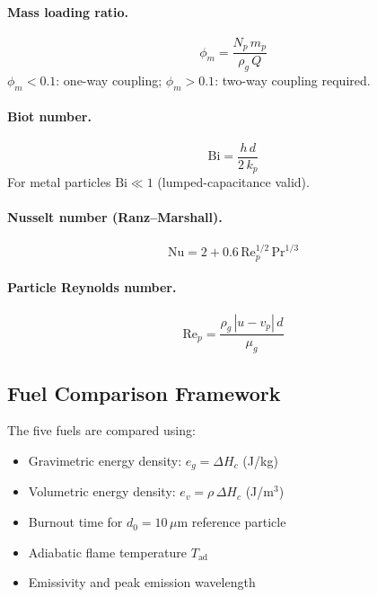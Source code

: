 \documentclass[11pt,a4paper]{article}
\begin{document}
\paragraph{Mass loading ratio.}
\begin{equation}\label{eq:phi_m}
  \phi_m = \frac{N_p\,m_p}{\rho_g\,Q}
\end{equation}
$\phi_m < 0.1$: one-way coupling; $\phi_m > 0.1$: two-way coupling required.

\paragraph{Biot number.}
\begin{equation}\label{eq:Bi}
  \mathrm{Bi} = \frac{h\,d}{2\,k_p}
\end{equation}
For metal particles $\mathrm{Bi} \ll 1$ (lumped-capacitance valid).

\paragraph{Nusselt number (Ranz--Marshall).}
\begin{equation}\label{eq:Nu_RM}
  \mathrm{Nu} = 2 + 0.6\,\mathrm{Re}_p^{1/2}\,\mathrm{Pr}^{1/3}
\end{equation}

\paragraph{Particle Reynolds number.}
\begin{equation}\label{eq:Re_p}
  \mathrm{Re}_p = \frac{\rho_g\,|u - v_p|\,d}{\mu_g}
\end{equation}

\subsection{Fuel Comparison Framework}

The five fuels are compared using:
\begin{itemize}
  \item Gravimetric energy density: $e_g = \Delta H_c$ (J/kg)
  \item Volumetric energy density: $e_v = \rho\,\Delta H_c$ (J/m$^3$)
  \item Burnout time for $d_0 = 10\,\mu$m reference particle
  \item Adiabatic flame temperature $T_{\mathrm{ad}}$
  \item Emissivity and peak emission wavelength
\end{itemize}
\end{document}
